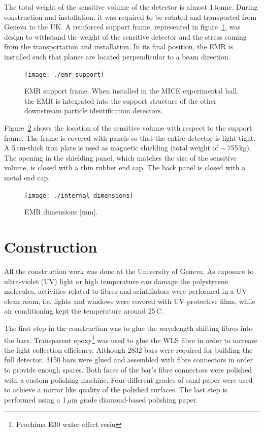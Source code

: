 \documentclass[a4paper,11pt]{article}
\begin{document}
The total weight of the sensitive volume of the detector is almost 1\,tonne. During construction and installation, it was required to be rotated and
transported from Geneva to the UK. A reinforced support frame, represented in figure~\ref{fig:emr_support}, was design to withstand the weight of the
sensitive detector and the stress coming from the transportation and installation. In its final position, the EMR is installed such that planes are
located perpendicular to a beam direction. 

\begin{figure}[htp!]
 \centering 
 \texttt{[image: ./emr\_support]}
 \caption[EMR support frame]{EMR support frame. When installed in the MICE experimental hall, the EMR is integrated into the support structure of the other 
 downstream particle identification detectors.}
 \label{fig:emr_support}
\end{figure}

Figure~\ref{fig:internal_dimensions} shows the location of the sensitive volume with respect to the support frame. The frame is covered with panels so that
the entire detector is light-tight. A 5\,cm-thick iron plate is used as magnetic shielding (total weight of $\sim\,$755\,kg). The opening in the shielding
panel, which matches the size of the sensitive volume, is closed with a thin rubber end cap. The back panel is closed with a metal end cap.

\begin{figure}[htp!]
 \centering
 \texttt{[image: ./internal\_dimensions]}
 \caption[EMR dimensions]{EMR dimensions [mm].}
 \label{fig:internal_dimensions}
\end{figure}

\section{Construction}\label{sec:construction}

All the construction work was done at the University of Geneva. As exposure to ultra-violet (UV) light or high temperature can damage the polystyrene
molecules, activities related to fibres and scintillators were performed in a UV clean room, i.e. lights and windows were covered with UV-protective
films, while air conditioning kept the temperature around 25\,\degree C. 

The first step in the construction was to glue the wavelength shifting fibres
into the bars. Transparent epoxy\footnote{Prochima E30 water effect resin} was used to glue the WLS fibre in order to increase the light collection
efficiency. Although 2832 bars were required for building the full detector, 3150 bars were glued and assembled with fibre connectors in order to
provide enough spares. Both faces of the bar's fibre connectors were polished with a custom polishing machine. Four different grades of sand paper
were used to achieve a mirror like quality of the polished surfaces. The last step is performed using a 1\,$\mu$m grade diamond-based polishing paper.
\end{document}
